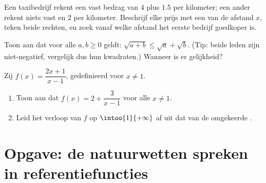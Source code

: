 \begin{exercise}[$\star\star$]\label{exo:g10:reffunc:8}
Een taxibedrijf rekent een vast bedrag van $4$ plus $1.5$ per kilometer; een
ander rekent niets vast en $2$ per kilometer. Beschrijf elke prijs met een
 van de afstand $x$, teken beide rechten, en zoek vanaf welke
afstand het eerste bedrijf goedkoper is.
\end{exercise}

\begin{exercise}[$\star\star$]\label{exo:g10:reffunc:9}
Toon aan dat voor alle $a, b \geq 0$ geldt: $\sqrt{a + b} \leq \sqrt a +
\sqrt b$. (Tip: beide leden zijn niet-negatief, vergelijk dus hun
kwadraten.) Wanneer is er gelijkheid?
\end{exercise}

\begin{exercise}[$\star\star\star$]\label{exo:g10:reffunc:10}
Zij $f(x) = \dfrac{2x + 1}{x - 1}$, gedefinieerd voor $x \neq 1$.
\begin{enumerate}
  \item Toon aan dat $f(x) = 2 + \dfrac{3}{x - 1}$ voor alle $x \neq 1$.
  \item Leid het verloop van $f$ op $\intoo{1}{+\infty}$ af uit dat van de
        omgekeerde .
\end{enumerate}
\end{exercise}

\section{Opgave: de natuurwetten spreken in referentiefuncties}

